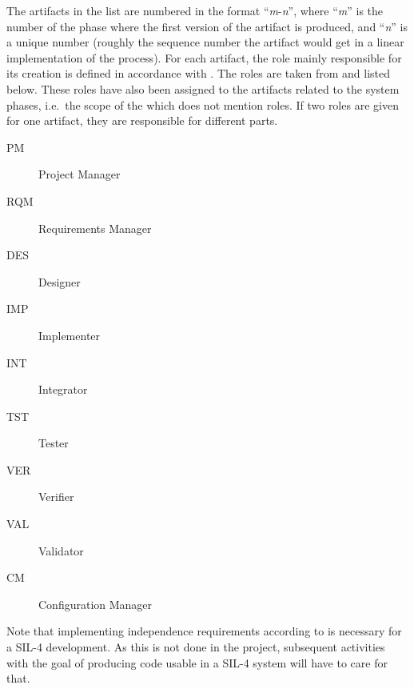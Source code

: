 \documentclass{template/openetcs_article}
\begin{document}
The artifacts in the list are numbered in the format
``\textit{m}-\textit{n}'', where ``\textit{m}'' is the number of the
phase where the first version of the artifact is produced, and
``\textit{n}'' is a unique number (roughly the sequence number the
artifact would get in a linear implementation of the process). For
each artifact, the role mainly responsible for its creation is defined
in accordance with \cite[Tab.~C.1]{EN50128:2011}. The roles are taken
from \cite[Sec.~5.1 / Fig.~2]{EN50128:2011} and listed below. These
roles have also been assigned to the artifacts related to the system phases,
i.e.\ the scope of the \cite{EN50126:1999} which does not mention
roles. If two roles are given for one artifact, they are responsible
for different parts.
%
\begin{description}
\item[PM] Project Manager
\item[RQM] Requirements Manager
\item[DES] Designer
\item[IMP] Implementer
\item[INT] Integrator
\item[TST] Tester
\item[VER] Verifier
\item[VAL] Validator
\item[CM] Configuration Manager 
\end{description}
%
%
Note that implementing independence requirements according to
\cite[5.1.2.10]{EN50128:2011} is necessary for a SIL-4 development. As
this is not done in the project, subsequent activities with the goal
of producing code usable in a SIL-4 system will have to
care for that.
\end{document}
